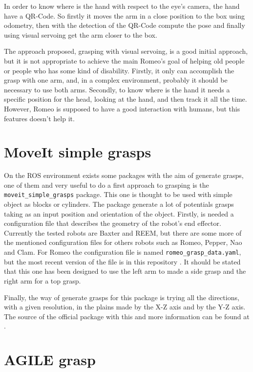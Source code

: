 \documentclass[12pt,a4paper,final,twoside,openright]{report}
\begin{document}
In order to know where is the hand with respect to the eye's camera, the hand have a QR-Code. So firstly it moves the arm in a close position to the box using odometry, then with the detection of the QR-Code compute the pose and finally using visual servoing get the arm closer to the box.

The approach proposed, grasping with visual servoing, is a good initial approach, but it is not appropriate to achieve the main Romeo's goal of helping old people or people who has some kind of disability. Firstly, it only can accomplish the grasp with one arm, and, in a complex environment, probably it should be necessary to use both arms. Secondly, to know where is the hand it needs a specific position for the head, looking at the hand, and then track it all the time. However, Romeo is supposed to have a good interaction with humans, but this features doesn't help it.

\section{MoveIt simple grasps}
\label{sec:moveit_simple_grasps}

On the ROS environment exists some packages with the aim of generate grasps, one of them and very useful to do a first approach to grasping is the \texttt{moveit\_simple\_grasps} package. This one is thought to be used with simple object as blocks or cylinders. The package generate a lot of potentials grasps taking as an input position and orientation of the object. Firstly, is needed a configuration file that describes the geometry of the robot's end effector. Currently the tested robots are Baxter and REEM, but there are some more of the mentioned configuration files for others robots such as Romeo, Pepper, Nao and Clam. For Romeo the configuration file is named \texttt{romeo\_grasp\_data.yaml}, but the most recent version of the file is in this repository \cite{gitNlyubovaGrasp}. It should be stated that this one has been designed to use the left arm to made a side grasp and the right arm for a top grasp.

Finally, the way of generate grasps for this package is trying all the directions, with a given resolution, in the plains made by the X-Z axis and by the Y-Z axis. The source of the official package with this and more information can be found at \cite{gitMoveitSimpleGrasp}.

\section{AGILE grasp}
\label{sec:agile grasp}
\end{document}
